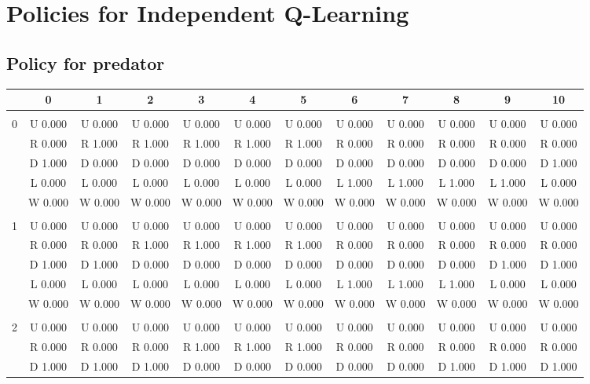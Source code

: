 \clearpage
\section{Policies for Independent Q-Learning} \label{app:policiesIQL}
\subsection{Policy for predator}
 \begin{table}[htbp]
\centering
\begin{tiny}
\begin{tabular}{c|c|c|c|c|c|c|c|c|c|c|c|}
&0&1&2&3&4&5&6&7&8&9&10\\ \hline\\
0&U 0.000&U 0.000&U 0.000&U 0.000&U 0.000&U 0.000&U 0.000&U 0.000&U 0.000&U 0.000&U 0.000\\
&R 0.000&R 1.000&R 1.000&R 1.000&R 1.000&R 1.000&R 0.000&R 0.000&R 0.000&R 0.000&R 0.000\\
&D 1.000&D 0.000&D 0.000&D 0.000&D 0.000&D 0.000&D 0.000&D 0.000&D 0.000&D 0.000&D 1.000\\
&L 0.000&L 0.000&L 0.000&L 0.000&L 0.000&L 0.000&L 1.000&L 1.000&L 1.000&L 1.000&L 0.000\\
&W 0.000&W 0.000&W 0.000&W 0.000&W 0.000&W 0.000&W 0.000&W 0.000&W 0.000&W 0.000&W 0.000\\
\hline \\
1&U 0.000&U 0.000&U 0.000&U 0.000&U 0.000&U 0.000&U 0.000&U 0.000&U 0.000&U 0.000&U 0.000\\
&R 0.000&R 0.000&R 1.000&R 1.000&R 1.000&R 1.000&R 0.000&R 0.000&R 0.000&R 0.000&R 0.000\\
&D 1.000&D 1.000&D 0.000&D 0.000&D 0.000&D 0.000&D 0.000&D 0.000&D 0.000&D 1.000&D 1.000\\
&L 0.000&L 0.000&L 0.000&L 0.000&L 0.000&L 0.000&L 1.000&L 1.000&L 1.000&L 0.000&L 0.000\\
&W 0.000&W 0.000&W 0.000&W 0.000&W 0.000&W 0.000&W 0.000&W 0.000&W 0.000&W 0.000&W 0.000\\
\hline \\
2&U 0.000&U 0.000&U 0.000&U 0.000&U 0.000&U 0.000&U 0.000&U 0.000&U 0.000&U 0.000&U 0.000\\
&R 0.000&R 0.000&R 0.000&R 1.000&R 1.000&R 1.000&R 0.000&R 0.000&R 0.000&R 0.000&R 0.000\\
&D 1.000&D 1.000&D 1.000&D 0.000&D 0.000&D 0.000&D 0.000&D 0.000&D 1.000&D 1.000&D 1.000\\

\end{tabular}
\end{tiny}
\end{table}
